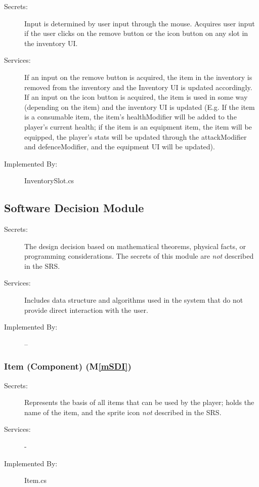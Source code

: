 \documentclass[12pt, titlepage]{article}
\newcommand{\mref}[1]{M\ref{#1}}
\begin{document}
\begin{description}
\item[Secrets:] Input is determined by user input through the mouse. Acquires user input if the user clicks on the remove button or the icon button on any slot in the inventory UI.
\item[Services:] If an input on the remove button is acquired, the item in the inventory is removed from the inventory and the Inventory UI is updated accordingly. If an input on the icon button is acquired, the item is used in some way (depending on the item) and the inventory UI is updated (E.g. If the item is a consumable item, the item's healthModifier will be added to the player's current health; if the item is an equipment item, the item will be equipped, the player's stats will be updated through the attackModifier and defenceModifier,  and the equipment UI will be updated).
\item[Implemented By:] InventorySlot.cs
\end{description}


\subsection{Software Decision Module}

\begin{description}
\item[Secrets:] The design decision based on mathematical theorems, physical
  facts, or programming considerations. The secrets of this module are
  \emph{not} described in the SRS.
\item[Services:] Includes data structure and algorithms used in the system that
  do not provide direct interaction with the user. 
\item[Implemented By:] --
\end{description}

\subsubsection{Item (Component) (\mref{mSDI})}

\begin{description}
\item[Secrets:] Represents the basis of all items that can be used by the player; holds the name of the item, and the sprite icon
  \emph{not} described in the SRS.
\item[Services:] -
\item[Implemented By:] Item.cs
\end{description}
\end{document}
